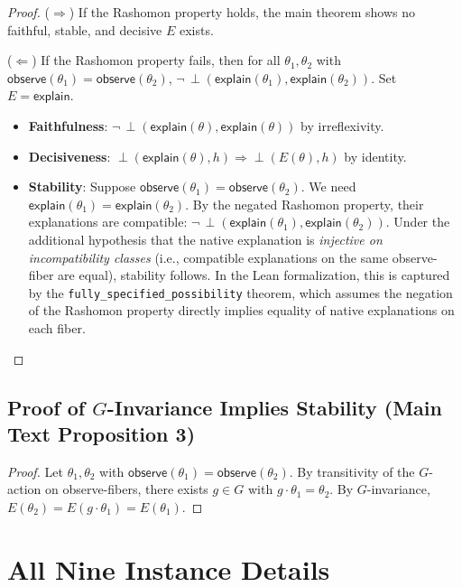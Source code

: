 \documentclass[11pt]{article}
\newcommand{\incomp}{\perp}
\begin{document}
\begin{proof}
($\Rightarrow$) If the Rashomon property holds, the main theorem shows no
faithful, stable, and decisive $E$ exists.

($\Leftarrow$) If the Rashomon property fails, then for all $\theta_1,
\theta_2$ with $\mathsf{observe}(\theta_1) = \mathsf{observe}(\theta_2)$,
$\neg\,\incomp(\mathsf{explain}(\theta_1), \mathsf{explain}(\theta_2))$.
Set $E = \mathsf{explain}$.
\begin{itemize}
  \item \textbf{Faithfulness}: $\neg\,\incomp(\mathsf{explain}(\theta),
    \mathsf{explain}(\theta))$ by irreflexivity.
  \item \textbf{Decisiveness}: $\incomp(\mathsf{explain}(\theta), h)
    \Rightarrow \incomp(E(\theta), h)$ by identity.
  \item \textbf{Stability}: Suppose $\mathsf{observe}(\theta_1) =
    \mathsf{observe}(\theta_2)$. We need
    $\mathsf{explain}(\theta_1) = \mathsf{explain}(\theta_2)$. By the
    negated Rashomon property, their explanations are compatible:
    $\neg\,\incomp(\mathsf{explain}(\theta_1),
    \mathsf{explain}(\theta_2))$. Under the additional hypothesis that
    the native explanation is \emph{injective on incompatibility classes}
    (i.e., compatible explanations on the same observe-fiber are equal),
    stability follows. In the Lean formalization, this is captured by the
    \texttt{fully\_specified\_possibility} theorem, which assumes the
    negation of the Rashomon property directly implies equality of native
    explanations on each fiber.
\end{itemize}
\end{proof}

\subsection{Proof of $G$-Invariance Implies Stability (Main Text Proposition 3)}

\begin{proof}
Let $\theta_1, \theta_2$ with $\mathsf{observe}(\theta_1) =
\mathsf{observe}(\theta_2)$. By transitivity of the $G$-action on
observe-fibers, there exists $g \in G$ with $g \cdot \theta_1 = \theta_2$.
By $G$-invariance, $E(\theta_2) = E(g \cdot \theta_1) = E(\theta_1)$.
\end{proof}


\section{All Nine Instance Details}
\label{sec:si-instances}
\end{document}
